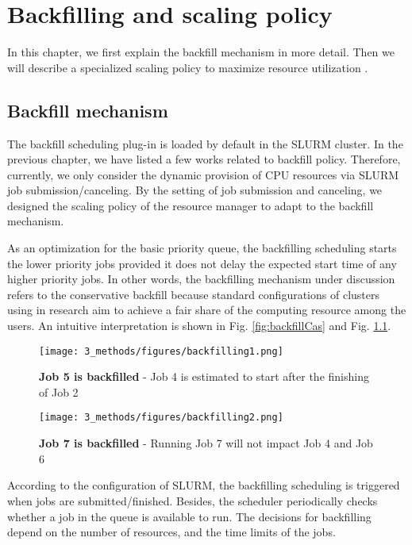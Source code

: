 
\chapter{Backfilling and scaling policy}\label{chapter:4-1} %

\ifpdf
    \graphicspath{{3_methods/figures/PNG/}{3_methods/figures/PDF/}{3_methods/figures/}}
\else
    \graphicspath{{3_methods/figures/EPS/}{3_methods/figures/}}
\fi

In this chapter, we first explain the backfill mechanism in more detail. 
Then we will describe a specialized scaling policy to maximize resource utilization . 

\section{Backfill mechanism}\label{sec:backfill}
The backfill scheduling plug-in is loaded by default in the SLURM cluster. 
In the previous chapter, we have listed a few works related to backfill policy. 
Therefore, currently, we only consider the dynamic provision of CPU resources via SLURM job submission/canceling.
By the setting of job submission and canceling, we designed the scaling policy of the resource manager to adapt to the backfill mechanism.

As an optimization for the basic priority queue, the backfilling scheduling starts the lower priority jobs provided it does not delay the expected start time of any higher priority jobs. 
In other words, the backfilling mechanism under discussion refers to the conservative backfill because standard configurations of clusters using in research aim to achieve a fair share of the computing resource among the users.
An intuitive interpretation is shown in Fig. \ref{fig:backfillCas} and Fig. \ref{fig:backfillCase}.

\begin{figure}[!h]
    \centering
    \begin{minipage}{.45\textwidth}
      \centering
      \texttt{[image: 3\_methods/figures/backfilling1.png]}
      \caption[Backfill case 1]{{\small\textbf{Job 5 is backfilled} - Job 4 is estimated to start after the finishing of Job 2}}
      \label{fig:backfillCas}
    \end{minipage} 
    \begin{minipage}{.45\textwidth}
      \centering
      \texttt{[image: 3\_methods/figures/backfilling2.png]}
      \caption[Backfill case 2]{{\small\textbf{Job 7 is backfilled} - Running Job 7 will not impact Job 4 and Job 6 }}
      \label{fig:backfillCase}
    \end{minipage}
\end{figure}
According to the configuration of SLURM, the backfilling scheduling is triggered when jobs are submitted/finished. 
Besides, the scheduler periodically checks whether a job in the queue is available to run.
The decisions for backfilling depend on the number of resources, and the time limits of the jobs. 

